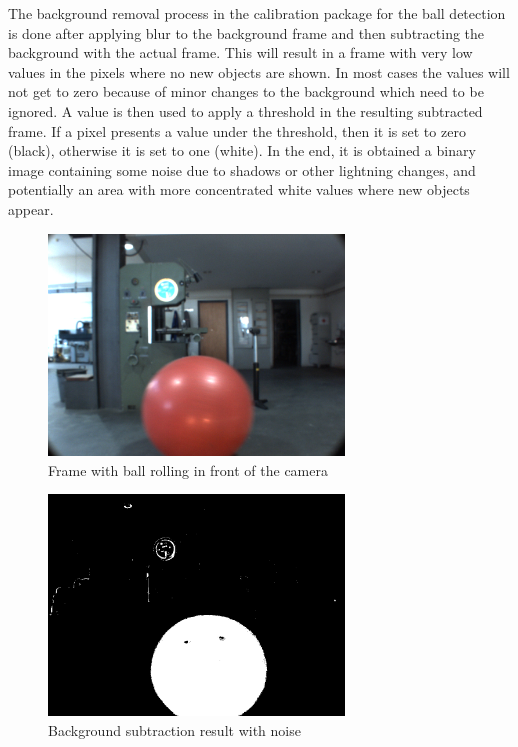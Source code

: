 The background removal process in the calibration package for the ball detection is done after applying blur to the background frame and then subtracting the background with the actual frame. This will result in a frame with very low values in the pixels where no new objects are shown. In most cases the values will not get to zero because of minor changes to the background which need to be ignored. A value is then used to apply a threshold in the resulting subtracted frame. If a pixel presents a value under the threshold, then it is set to zero (black), otherwise it is set to one (white). In the end, it is obtained a binary image containing some noise due to shadows or other lightning changes, and potentially an area with more concentrated white values where new objects appear. 


\begin{figure}[htp]
	
	\centering
	\includegraphics[width=0.7\textwidth]{capcalib/imgs/ball_test.png}
	
	\caption{Frame with ball rolling in front of the camera}
	\label{fig:balltest}
	
\end{figure}


\begin{figure}[htp]
	
	\centering
	\includegraphics[width=0.7\textwidth]{capcalib/imgs/noise.png}
	
	\caption{Background subtraction result with noise}
	\label{fig:ballnoise}
	
\end{figure}

